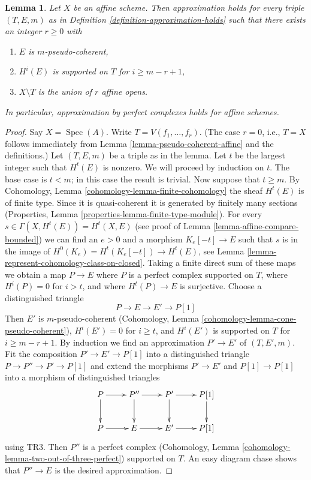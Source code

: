 \documentclass{stacks-project}
\theoremstyle{plain}
\newtheorem{lemma}[subsection]{Lemma}
\theoremstyle{definition}
\theoremstyle{remark}
\numberwithin{equation}{subsection}
\def\Spec{\mathop{\mathrm{Spec}}}
\begin{document}
\begin{lemma}
\label{lemma-approximation-affine}
Let $X$ be an affine scheme. Then approximation holds for every
triple $(T, E, m)$ as in Definition \ref{definition-approximation-holds}
such that there exists an integer $r \geq 0$ with
\begin{enumerate}
\item $E$ is $m$-pseudo-coherent,
\item $H^i(E)$ is supported on $T$ for $i \geq m - r + 1$,
\item $X \setminus T$ is the union of $r$ affine opens.
\end{enumerate}
In particular, approximation by perfect complexes holds for affine schemes.
\end{lemma}

\begin{proof}
Say $X = \Spec(A)$. Write $T = V(f_1, \ldots, f_r)$.
(The case $r = 0$, i.e., $T = X$ follows immediately from
Lemma \ref{lemma-pseudo-coherent-affine} and the definitions.)
Let $(T, E, m)$ be a triple as in the lemma.
Let $t$ be the largest integer such that $H^t(E)$ is nonzero.
We will proceed by induction on $t$. The base case is $t < m$; in
this case the result is trivial. Now suppose that $t \geq m$. By
Cohomology, Lemma \ref{cohomology-lemma-finite-cohomology}
the sheaf $H^t(E)$ is of finite type. Since it is quasi-coherent
it is generated by finitely many sections
(Properties, Lemma \ref{properties-lemma-finite-type-module}).
For every $s \in \Gamma(X, H^t(E)) = H^t(X, E)$
(see proof of Lemma \ref{lemma-affine-compare-bounded})
we can find an $e > 0$ and a morphism $K_e[-t] \to E$
such that $s$ is in the image of
$H^0(K_e) = H^t(K_e[-t]) \to H^t(E)$, see
Lemma \ref{lemma-represent-cohomology-class-on-closed}.
Taking a finite direct sum of these maps we obtain a map
$P \to E$ where $P$ is a perfect complex supported on $T$,
where $H^i(P) = 0$ for $i > t$, and where $H^t(P) \to E$ is
surjective. Choose a distinguished triangle
$$
P \to E \to E' \to P[1]
$$
Then $E'$ is $m$-pseudo-coherent
(Cohomology, Lemma \ref{cohomology-lemma-cone-pseudo-coherent}),
$H^i(E') = 0$ for $i \geq t$, and
$H^i(E')$ is supported on $T$ for $i \geq m - r + 1$.
By induction we find an approximation $P' \to E'$
of $(T, E', m)$. Fit the composition $P' \to E' \to P[1]$
into a distinguished triangle $P \to P'' \to P' \to P[1]$
and extend the morphisms $P' \to E'$ and $P[1] \to P[1]$ into
a morphism of distinguished triangles
$$
\xymatrix{
P \ar[r] \ar[d] & P'' \ar[d] \ar[r] & P' \ar[d] \ar[r] & P[1] \ar[d] \\
P \ar[r] &  E \ar[r] & E' \ar[r] & P[1]
}
$$
using TR3. Then $P''$ is a perfect complex
(Cohomology, Lemma \ref{cohomology-lemma-two-out-of-three-perfect})
supported on $T$.
An easy diagram chase shows that $P'' \to E$ is the desired
approximation.
\end{proof}
\end{document}
